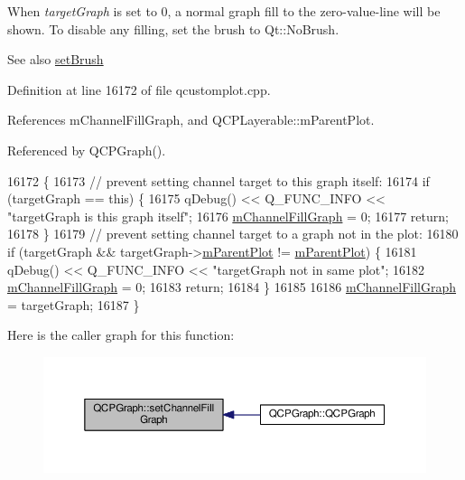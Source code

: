 When {\itshape target\+Graph} is set to 0, a normal graph fill to the zero-\/value-\/line will be shown. To disable any filling, set the brush to Qt\+::\+No\+Brush.

\begin{DoxySeeAlso}{See also}
\hyperlink{class_q_c_p_abstract_plottable_a7a4b92144dca6453a1f0f210e27edc74}{set\+Brush} 
\end{DoxySeeAlso}


Definition at line 16172 of file qcustomplot.\+cpp.



References m\+Channel\+Fill\+Graph, and Q\+C\+P\+Layerable\+::m\+Parent\+Plot.



Referenced by Q\+C\+P\+Graph().


\begin{DoxyCode}
16172                                                         \{
16173   \textcolor{comment}{// prevent setting channel target to this graph itself:}
16174   \textcolor{keywordflow}{if} (targetGraph == \textcolor{keyword}{this}) \{
16175     qDebug() << Q\_FUNC\_INFO << \textcolor{stringliteral}{"targetGraph is this graph itself"};
16176     \hyperlink{class_q_c_p_graph_a2f1777c7accf8244fc640c33f0b04577}{mChannelFillGraph} = 0;
16177     \textcolor{keywordflow}{return};
16178   \}
16179   \textcolor{comment}{// prevent setting channel target to a graph not in the plot:}
16180   \textcolor{keywordflow}{if} (targetGraph && targetGraph->\hyperlink{class_q_c_p_layerable_aa2a528433e44db02b8aef23c1f9f90ed}{mParentPlot} != \hyperlink{class_q_c_p_layerable_aa2a528433e44db02b8aef23c1f9f90ed}{mParentPlot}) \{
16181     qDebug() << Q\_FUNC\_INFO << \textcolor{stringliteral}{"targetGraph not in same plot"};
16182     \hyperlink{class_q_c_p_graph_a2f1777c7accf8244fc640c33f0b04577}{mChannelFillGraph} = 0;
16183     \textcolor{keywordflow}{return};
16184   \}
16185 
16186   \hyperlink{class_q_c_p_graph_a2f1777c7accf8244fc640c33f0b04577}{mChannelFillGraph} = targetGraph;
16187 \}
\end{DoxyCode}


Here is the caller graph for this function\+:\nopagebreak
\begin{figure}[H]
\begin{center}
\leavevmode
\includegraphics[width=350pt]{class_q_c_p_graph_a2d03156df1b64037a2e36cfa50351ca3_icgraph}
\end{center}
\end{figure}


